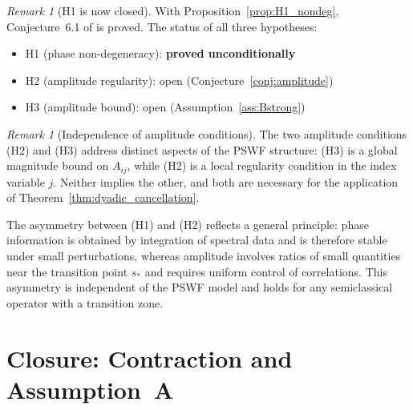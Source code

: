 \documentclass[12pt]{amsart}
\theoremstyle{definition}
\theoremstyle{remark}
\newtheorem{remark}[theorem]{Remark}
\begin{document}
\begin{remark}[H1 is now closed]
\label{rem:H1_closed}
With Proposition~\ref{prop:H1_nondeg},
Conjecture~6.1 of \cite{paperVI} is proved.
The status of all three hypotheses:
\begin{itemize}
  \item H1 (phase non-degeneracy): \textbf{proved unconditionally}
        \cite{PhaseNondeg}
  \item H2 (amplitude regularity): open (Conjecture~\ref{conj:amplitude})
  \item H3 (amplitude bound): open (Assumption~\ref{ass:Bstrong})
\end{itemize}
\end{remark}

\begin{remark}[Independence of amplitude conditions]
\label{rem:H2H3_independent}
The two amplitude conditions \textup{(H2)} and \textup{(H3)}
address distinct aspects of the PSWF structure:
\textup{(H3)} is a global magnitude bound on $A_{ij}$,
while \textup{(H2)} is a local regularity condition
in the index variable $j$.
Neither implies the other, and both are necessary for the
application of Theorem~\ref{thm:dyadic_cancellation}.

\medskip\noindent
The asymmetry between \textup{(H1)} and \textup{(H2)}
reflects a general principle: phase information is obtained
by integration of spectral data and is therefore stable under
small perturbations, whereas amplitude involves ratios of
small quantities near the transition point $s_*$ and requires
uniform control of correlations.
This asymmetry is independent of the PSWF model and holds
for any semiclassical operator with a transition zone.
\end{remark}

\section{Closure: Contraction and Assumption~A}
\label{sec:closure}
\end{document}

